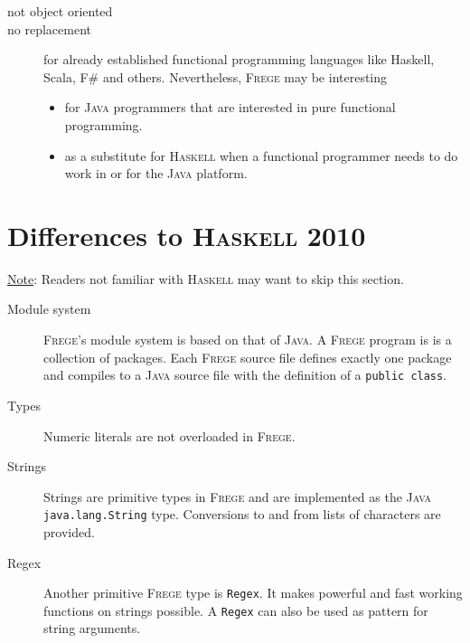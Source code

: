 \documentclass[a4paper,landscape,twocolumn]{report}
\newcommand{\boxquote}[3]{
\begin{center}
\colorbox{#1}%
{\parbox{0.45\textwidth}{
\sf
\underline{#2}:
#3
}}
\end{center}}
\newcommand{\note}[1]{\boxquote{grau}{Note}{#1}}
\newcommand{\haskell}[0]{\textsc{Haskell}}
\newcommand{\frege}[0]{\textsc{Frege}}
\newcommand{\java}[0]{\textsc{Java}}
\begin{document}
\begin{description}

\item[not object oriented]

\item[no replacement]

for already established functional programming languages like Haskell,
Scala, F\# and others.
Nevertheless, \frege{} may be interesting
\begin{itemize}
\item for \java{} programmers that are interested in pure functional programming. 
\item as a substitute for \haskell{} when a functional programmer needs to do work in or for the \java{} platform. 
\end{itemize}

\end{description}

\section{Differences to \haskell{} 2010}

\note{Readers not familiar with \haskell{} may want to skip this
section.}

\begin{description}
\item[Module system]
\frege{}'s module system is based on that of \java{}. A \frege{}
program is is a collection of packages. Each \frege{}
source file defines exactly one package
and compiles to a \java{} source file with the definition of a
\texttt{public class}.


\item[Types]

Numeric literals are not overloaded in \frege{}. 

\item[Strings]
Strings are primitive types in \frege{} and are implemented
as the \java{} \texttt{java.lang.String} type.
Conversions to and
from lists of characters are provided.

\item[Regex]
\par Another primitive \frege{} type is \texttt{Regex}. It makes
powerful
and fast working functions on strings possible. A \texttt{Regex} can
also
be used as pattern for string arguments.

\end{description}
\end{document}
